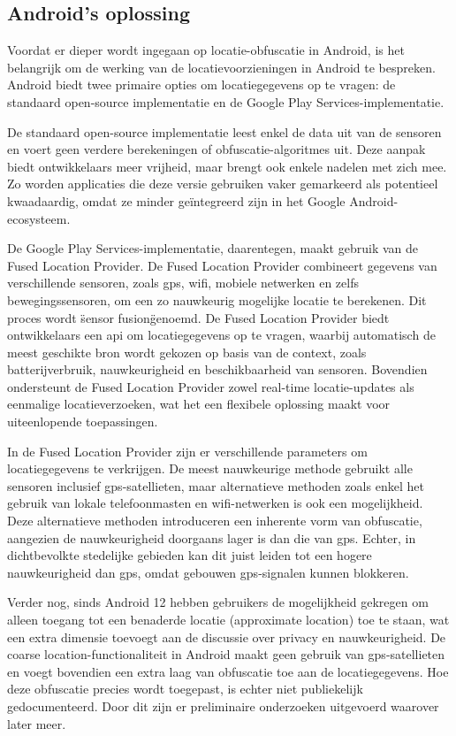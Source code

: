 \subsection{Android's oplossing}
Voordat er dieper wordt ingegaan op locatie-obfuscatie in Android, is het belangrijk om de werking van de locatievoorzieningen in Android te bespreken. Android biedt twee primaire opties om locatiegegevens op te vragen: de standaard open-source implementatie en de Google Play Services-implementatie.

De standaard open-source implementatie leest enkel de data uit van de sensoren en voert geen verdere berekeningen of obfuscatie-algoritmes uit. Deze aanpak biedt ontwikkelaars meer vrijheid, maar brengt ook enkele nadelen met zich mee. Zo worden applicaties die deze versie gebruiken vaker gemarkeerd als potentieel kwaadaardig, omdat ze minder geïntegreerd zijn in het Google Android-ecosysteem.

De Google Play Services-implementatie, daarentegen, maakt gebruik van de Fused Location Provider. De Fused Location Provider combineert gegevens van verschillende sensoren, zoals \gls{gps}, wifi, mobiele netwerken en zelfs bewegingssensoren, om een zo nauwkeurig mogelijke locatie te berekenen. Dit proces wordt \"sensor fusion\" genoemd. De Fused Location Provider biedt ontwikkelaars een \gls{api} om locatiegegevens op te vragen, waarbij automatisch de meest geschikte bron wordt gekozen op basis van de context, zoals batterijverbruik, nauwkeurigheid en beschikbaarheid van sensoren. Bovendien ondersteunt de Fused Location Provider zowel real-time locatie-updates als eenmalige locatieverzoeken, wat het een flexibele oplossing maakt voor uiteenlopende toepassingen.

In de Fused Location Provider zijn er verschillende parameters om locatiegegevens te verkrijgen. 
De meest nauwkeurige methode gebruikt alle sensoren inclusief \gls{gps}-satellieten, maar alternatieve methoden zoals enkel het gebruik van lokale telefoonmasten en wifi-netwerken is ook een mogelijkheid. 
Deze alternatieve methoden introduceren een inherente vorm van obfuscatie, aangezien de nauwkeurigheid doorgaans lager is dan die van \gls{gps}. Echter, in dichtbevolkte stedelijke gebieden kan dit juist leiden tot een hogere nauwkeurigheid dan \gls{gps}, omdat gebouwen \gls{gps}-signalen kunnen blokkeren.

Verder nog, sinds Android 12 hebben gebruikers de mogelijkheid gekregen om alleen toegang tot een benaderde locatie (approximate location) toe te staan, wat een extra dimensie toevoegt aan de discussie over privacy en nauwkeurigheid.
De coarse location-functionaliteit in Android maakt geen gebruik van \gls{gps}-satellieten en voegt bovendien een extra laag van obfuscatie toe aan de locatiegegevens. Hoe deze obfuscatie precies wordt toegepast, is echter niet publiekelijk gedocumenteerd. Door dit zijn er preliminaire onderzoeken uitgevoerd waarover later meer.

